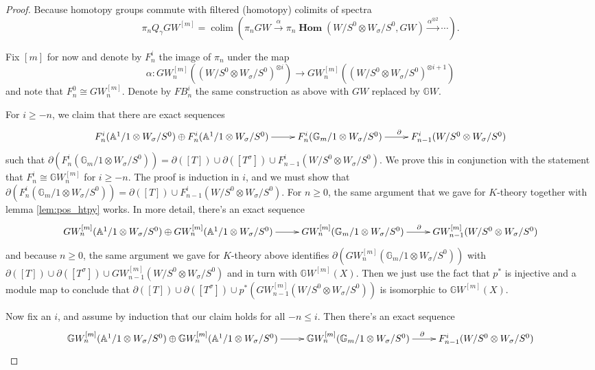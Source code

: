 \documentclass[edeposit,fullpage]{uiucthesis2009}
\newcommand{\mbb}{\mathbb}
\DeclareMathOperator*{\colim}{colim}
\DeclareMathOperator{\iHom}{\mathbf{Hom}}
\theoremstyle{plain}
\numberwithin{lemma}{section}
\theoremstyle{definition}
\begin{document}
\begin{proof}
Because homotopy groups
commute with filtered (homotopy) colimits of spectra
\[
\pi_nQ_\gamma GW^{[m]} = \colim(\pi_n GW \xrightarrow{\alpha} \pi_n\iHom(W/S^0
\otimes W_\sigma/S^0,GW) \xrightarrow{\alpha^{\otimes  2}} \cdots).
\]

Fix $[m]$ for now and denote by $F^i_n$ the image of $\pi_n$ under
the map
\[
\alpha : GW_n^{[m]}((W/S^0 \otimes W_\sigma/S^0)^{\otimes i})
\rightarrow GW_n^{[m]}((W/S^0 \otimes W_\sigma/S^0)^{\otimes i+1})
\]
and note that $F^0_n \cong GW^{[m]}_n$. Denote by $FB^i_n$ the same
construction as above with $GW$ replaced by $\mbb GW$.

For $i \geq -n$, we claim that there are exact sequences
\[
\xymatrix{F^i_n(\mbb A^1/1 \otimes W_\sigma/S^0)  \oplus F^i_n(\mbb
  A^1/1 \otimes W_\sigma/S^0)  \ar[r] & F^i_n(\mbb G_m/1 \otimes W_\sigma/S^0) \ar[r]^{\partial} &
  F^{i}_{n-1}(W/S^0 \otimes W_\sigma/S^0) }
\]
such that $\partial(F^i_n(\mbb
G_m/1 \otimes W_\sigma/S^0)) = \partial([T]) \cup \partial([T^\sigma])
\cup  F^{i}_{n-1}(W/S^0 \otimes W_\sigma/S^0)$. We prove this in conjunction with the
statement that  $F^i_n \cong \mbb
GW^{[m]}_n$ for $i \geq -n$. The proof is induction in $i$, and we
must show that $\partial(F^i_n(\mbb
G_m/1 \otimes W_\sigma/S^0)) = \partial([T]) \cup  F^{i}_{n-1}(W/S^0
\otimes W_\sigma/S^0)$. For $n \geq 0$, the same argument that we
gave for $K$-theory together with lemma \ref{lem:pos_htpy} works. In
more detail, there's an exact sequence
\[
\xymatrix{GW^{[m]}_n(\mbb A^1/1 \otimes W_\sigma/S^0)  \oplus GW^{[m]}_n(\mbb
  A^1/1 \otimes W_\sigma/S^0)  \ar[r] & GW^{[m]}_n(\mbb G_m/1 \otimes W_\sigma/S^0) \ar[r]^{\partial} &
  GW^{[m]}_{n-1}(W/S^0 \otimes W_\sigma/S^0)  }
\]
and because $n \geq 0$, the same argument we gave for $K$-theory above
identifies $\partial( GW^{[m]}_n(\mbb G_m/1 \otimes W_\sigma/S^0))$
with $\partial([T]) \cup \partial([T^\sigma]) \cup
GW^{[m]}_{n-1}(W/S^0\otimes W_\sigma/S^0)$ and in turn
with $\mbb GW^{[m]}(X)$. Then we just use the fact that $p^*$ is
injective and a module map to conclude that $\partial([T]) \cup \partial([T^\sigma]) \cup
p^*(GW^{[m]}_{n-1}(W/S^0\otimes W_\sigma/S^0))$ is isomorphic to $\mbb GW^{[m]}(X)$.

Now fix an $i$, and assume by induction that our claim holds for all
$-n \leq i$. Then there's an exact sequence 
\[
\xymatrix{\mbb GW^{[m]}_n(\mbb A^1/1 \otimes W_\sigma/S^0)  \oplus
  \mbb GW^{[m]}_n(\mbb
  A^1/1 \otimes W_\sigma/S^0)  \ar[r] & \mbb GW^{[m]}_n(\mbb G_m/1
  \otimes W_\sigma/S^0) \ar[r]^{\partial} & F^{i}_{n-1}(W/S^0 \otimes W_\sigma/S^0)
}
\]


\end{proof}
\end{document}
